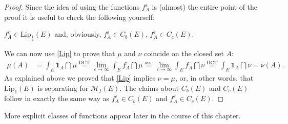 \begin{proof}[Proof]
			Since the idea of using the functions $f_A^\varepsilon$ is (almost) the entire point of the proof it is useful to check the following yourself:
			\begin{luebung}
				$f_A^{\varepsilon} \in \text{Lip}_{\frac{1}{\varepsilon}}(E)$ and, obviously, $f_A^{\varepsilon} \in C_b(E)$, $f_A^{\varepsilon} \in C_c(E)$.
			\end{luebung}
			We can now use \eqref{Lip} to prove that $\mu$ and $\nu$ coincide on the closed set $A$:
			\begin{align*}
				\mu (A) &= \int_E \mathbf 1_A \dint \mu 
							\overset{\text{DCT}}{=}\lim\limits_{\varepsilon \to \infty} \int_E f_A^{\varepsilon} \dint \mu 
				\overset{\text{ass.}}{=} \lim\limits_{\varepsilon \to \infty} \int_E f_A^{\varepsilon} \dint \nu 
				\overset{\text{DCT}}{=} \int_E \mathbf 1_A \dint \nu = \nu (A).
			\end{align*}
		As explained above we proved that \eqref{Lip} implies $\nu=\mu$, or, in other words, that $\text{Lip}_1(E)$ is separating for $\mathcal M_f(E)$. The claims about $C_b(E)$ and $C_c(E)$ follow in exactly the same way as $f_A^\varepsilon\in C_b(E)$ and $f_A^\varepsilon\in C_c(E)$.
\end{proof}
More explicit classes of functions appear later in the course of this chapter.

